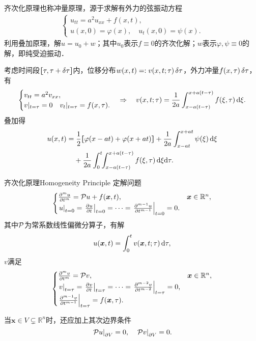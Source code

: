 齐次化原理也称冲量原理，源于求解有外力的弦振动方程
\begin{align*}
	\begin{cases}
		u_{tt}=a^2u_{xx}+f(x,t),\\
		u(x,0)=\varphi(x),\quad u_t(x,0)=\psi(x).
	\end{cases}
\end{align*}
利用叠加原理，解$u=u_0+w$；其中$u_0$表示$f\equiv 0$的齐次化解；$w$表示$\varphi,\psi\equiv 0$的解，即纯受迫振动．

考虑时间段$\zkh{\tau,\tau+\vd\tau}$内，位移分布$w(x,t)=:v(x,t;\tau)\vd\tau$，外力冲量$f(x,\tau)\vd\tau$，有
\begin{align*}
	\begin{cases}
			v_{tt}=a^2v_{xx},\\
			v|_{t=\tau}=0\quad v_t|_{t=\tau}=f(x,\tau).
	\end{cases}\Rightarrow\quad v(x,t;\tau)=\frac1{2a}\int_{x-a(t-\tau)}^{x+a(t-\tau)}f(\xi,\tau)\d\xi.
\end{align*}
叠加得
\begin{align}
	\begin{aligned}
		u(x,t)= &\;\frac12\zkh{\varphi(x-at)+\varphi(x+at)}+\frac1{2a}\int_{x-at}^{x+at}\psi(\xi)\d\xi \\
		        & +\frac1{2a}\int_0^t\bs3\int_{x-a(t-\tau)}^{x+a(t-\tau)}f(\xi,\tau)\d\xi\nd\tau.
	\end{aligned}
\end{align}
\begin{theorem}{齐次化原理}{Homogeneity Principle}
	定解问题
	\begin{align*}
		\begin{cases}
			\frac{\p^mu}{\p t^m}=\Par u+f(\bm x,t),&\bm x\in\mathbb R^n,\\
			\edg u_{t=0}=\edg{\pv ut}_{t=0}=\cdots=\edg{\frac{\p^{m-1}u}{\p t^{m-1}}}_{t=0}=0.
		\end{cases}
	\end{align*}
	其中$\Par$为常系数线性偏微分算子，有解
	\[u(\bm x,t)=\int_0^tv(\bm x,t;\tau)\d\tau,\]
	$v$满足
	\begin{align*}
		\begin{cases}
			\pu mvt=\Par v,&\bm x\in\mathbb R^n,\\
			\edg v_{t=\tau}=\edg{\pv v{t}}_{t=\tau}=\cdots=\edg{\pu{m-2}vt}_{t=\tau}=0, \\
			\edg{\pu{m-1}vt}_{t=\tau}=f(\bm x,\tau).
		\end{cases}
	\end{align*}

	当$\bm x\in V\subsetneq\mathbb R^n$时，还应加上其次边界条件
	\[\edg{\Par u}_{\p V}=0,\quad\edg{\Par v}_{\p V}=0.\]
\end{theorem}
\clearpage
